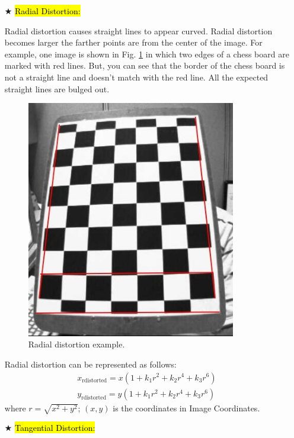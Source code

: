\documentclass{article}
\begin{document}
\begin{itemize}
	\item [$\bigstar$] \hl{Radial Distortion:}
	
	Radial distortion causes straight lines to appear curved. Radial distortion becomes larger the farther points are from the center of the image. For example, one image is shown in Fig. \ref{fig_Radial_distortion} in which two edges of a chess board are marked with red lines. But, you can see that the border of the chess board is not a straight line and doesn't match with the red line. All the expected straight lines are bulged out.
	\begin{figure}[!t]
		\centering
		\includegraphics[height=4.1in,width=5.0 in]{./img_cur/radial_distortion.jpg}
		\caption{Radial distortion example.}
		\vspace{-1.0em}
		\label{fig_Radial_distortion}
	\end{figure}
	Radial distortion can be represented as follows:
		\begin{equation}
		\begin{array}{l}
			x_{\text {rdistorted}}=x\left(1+k_{1} r^{2}+k_{2} r^{4}+k_{3} r^{6}\right) \\
			y_{\text {rdistorted}}=y\left(1+k_{1} r^{2}+k_{2} r^{4}+k_{3} r^{6}\right)
		\end{array}
		\label{Eq_radial_distortion}
		\end{equation}
		where $r=\sqrt{x^2+y^2}$; $(x,y)$ is the coordinates in Image Coordinates.
	
	\item [$\bigstar$] \hl{Tangential Distortion:}	
	

\end{itemize}
\end{document}
